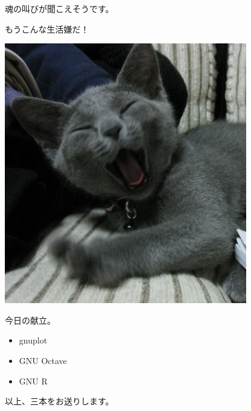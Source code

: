 \begin{frame}{魂の叫びが聞こえそうです。}
 \begin{minipage}[t]{0.45\hsize}
  \huge{もうこんな生活嫌だ！}
 \end{minipage}
 \begin{minipage}[t]{0.45\hsize}
  \includegraphics[width=1\hsize]{image200911/komame.png}
 \end{minipage}
\end{frame}

\begin{frame}{今日の献立。}
\begin{itemize}
\item gnuplot
\item GNU Octave
\item GNU R
\end{itemize}

以上、三本をお送りします。
\end{frame}

